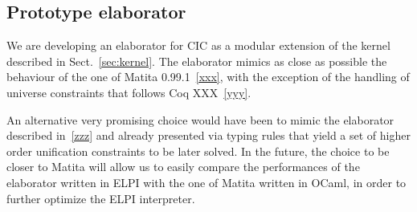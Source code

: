 \documentclass{easychair}
\begin{document}


\subsection{Prototype elaborator}\label{sec:elaborator}
We are developing an elaborator for CIC as a modular extension of the kernel described in Sect.~\ref{sec:kernel}. The elaborator mimics as close as possible the behaviour of the one of Matita 0.99.1~\ref{xxx}, with the exception of the handling of universe constraints that follows Coq XXX~\ref{yyy}.

An alternative very promising choice would have been to mimic the elaborator described in~\ref{zzz} and already presented via typing rules that yield a set of higher order unification constraints to be later solved. In the future, the choice to be closer to Matita will allow us to easily compare the performances of the elaborator written in ELPI with the one of Matita written in OCaml, in order to further optimize the ELPI interpreter.
\end{document}
